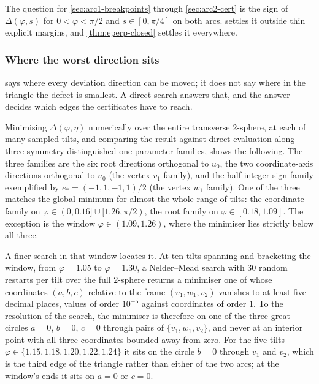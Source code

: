 \documentclass[11pt,reqno]{amsart}
\renewcommand{\_}{\origunderscore\allowbreak}
\numberwithin{equation}{section}
\theoremstyle{plain}
\theoremstyle{definition}
\theoremstyle{remark}
\newcommand{\tilt}{\varphi}                  %
\newcommand{\arcp}{s}                        %
\newcommand{\dev}{\eta}                      %
\newcommand{\defect}{\Delta}                 %
\newcommand{\base}{u}                        %
\begin{document}
The question for \cref{sec:arc1-breakpoints} through
\cref{sec:arc2-cert} is the sign of $\defect(\tilt,\arcp)$ for
$0<\tilt<\pi/2$ and $\arcp\in[0,\pi/4]$ on both arcs.
 settles it outside thin explicit
margins, and \cref{thm:eperp-closed} settles it everywhere.

\subsubsection{Where the worst direction sits}\label{sec:why-boundary-arcs}

 says where every deviation direction can
be moved; it does not say where in the triangle the defect is smallest.
A direct search answers that, and the answer decides which edges the
certificates have to reach.

Minimising $\defect(\tilt,\dev)$ numerically over the entire transverse
$2$-sphere, at each of many sampled tilts, and comparing the result
against direct evaluation along three symmetry-distinguished
one-parameter families, shows the following. The three
families are the six root directions orthogonal to
$\base_0$, the two coordinate-axis directions orthogonal to $\base_0$
(the vertex $v_1$ family), and the half-integer-sign family exemplified
by $e_*=(-1,1,-1,1)/2$ (the vertex $w_1$ family). One of the three
matches the global minimum for almost the whole range of tilts: the
coordinate family on $\tilt\in(0,0.16]\cup[1.26,\pi/2)$, the root
family on $\tilt\in[0.18,1.09]$. The exception is the window
$\tilt\in(1.09,1.26)$, where the minimiser lies strictly below all
three.

A finer search in that window locates it. At ten tilts spanning and
bracketing the window, from $\tilt=1.05$ to $\tilt=1.30$, a
Nelder--Mead search with $30$ random restarts per tilt over the full
$2$-sphere returns a minimiser one of whose coordinates $(a,b,c)$
relative to the frame $(v_1,w_1,v_2)$ vanishes to at least five decimal
places, values of order $10^{-5}$ against coordinates of order $1$. To
the resolution of the search, the minimiser is therefore on one of the
three great circles $a=0$, $b=0$, $c=0$ through pairs of
$\{v_1,w_1,v_2\}$, and never at an interior point with all three
coordinates bounded away from zero. For the five tilts
$\tilt\in\{1.15,1.18,1.20,1.22,1.24\}$ it sits on the circle $b=0$
through $v_1$ and $v_2$, which is the third edge of the triangle rather
than either of the two arcs; at the window's ends it sits on $a=0$ or
$c=0$.
\end{document}
